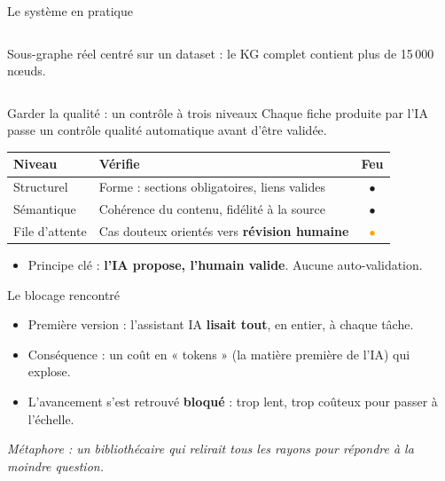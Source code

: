 \documentclass[aspectratio=169,11pt]{beamer}
\begin{document}
\begin{frame}{Le système en pratique}
\begin{columns}
{
}

{\tiny\textcolor{mygray}{Sous-graphe réel centré sur un dataset :
le KG complet contient plus de 15\,000 nœuds.}}
\end{columns}
\end{frame}

\begin{frame}{Garder la qualité : un contrôle à trois niveaux}
\small
Chaque fiche produite par l'IA passe un contrôle qualité automatique avant d'être validée.
\vspace{0.3cm}
\begin{tabularx}{\textwidth}{>{\RaggedRight\arraybackslash}p{} >{\RaggedRight\arraybackslash}X c}
\toprule
\textbf{Niveau} & \textbf{Vérifie} & \textbf{Feu} \\
\midrule
Structurel & Forme : sections obligatoires, liens valides & \textcolor{mygreen}{$\bullet$} \\
Sémantique & Cohérence du contenu, fidélité à la source & \textcolor{myred}{$\bullet$} \\
File d'attente & Cas douteux orientés vers \textbf{révision humaine} & \textcolor{orange}{$\bullet$} \\
\bottomrule
\end{tabularx}
\vspace{0.3cm}
\begin{itemize}
    \item Principe clé : \textbf{l'IA propose, l'humain valide}. Aucune auto-validation.
\end{itemize}
\end{frame}

\begin{frame}{Le blocage rencontré}
\begin{itemize}
    \item Première version : l'assistant IA \textbf{lisait tout}, en entier, à chaque tâche.
    \vspace{0.25cm}
    \item Conséquence : un coût en « tokens » (la matière première de l'IA) qui explose.
    \vspace{0.25cm}
    \item L'avancement s'est retrouvé \textbf{bloqué} : trop lent, trop coûteux pour passer à l'échelle.
\end{itemize}
\vspace{0.4cm}
\begin{center}
\emph{Métaphore : un bibliothécaire qui relirait tous les rayons pour répondre à la moindre question.}
\end{center}
\end{frame}
\end{document}
